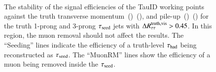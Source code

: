         \begin{figure}[hbtp]
            \begin{center}
                \vspace{-0.45cm} %
                \\
                \caption{The stability of the signal efficiencies of the TauID working points against 
                    the truth transverse momentum~(\protect{})~(\protect{}), 
                    and pile-up~(\protect{})~(\protect{}) for 
                    the truth 1-prong and 3-prong $\tau_\mathrm{seed}$ jets with $\Delta R^\mathrm{truth, vis}_\mathrm{\tau\tau} > 0.45$. 
                    In this region, the muon removal should not affect the results. The ``Seeding'' lines indicate the efficiency 
                    of a truth-level $\tau_{\text{had}}$ being reconstructed as $\tau_\mathrm{seed}$. The ``MuonRM'' lines show the efficiency of 
                    a muon being removed inside the $\tau_\mathrm{seed}$.}
                \label{fig:murm:45drstability}
            \end{center}
        \end{figure}

